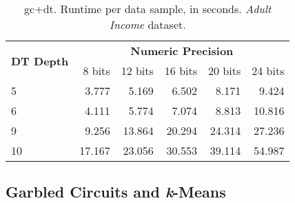 \begin{table}[!h]
\centering
\caption{\acs{gc}+\acs{dt}. Runtime per data sample, in seconds. \emph{Adult Income} dataset.}
\label{table:runtimeDTAI}
\vspace*{0.2cm}
\begin{tabular}{|l|r|r|r|r|r|}
\hline
\multirow{2}{*}{\textbf{DT Depth}} & \multicolumn{5}{c|}{\textbf{Numeric Precision}}         \\ \cline{2-6} 
                          & 8 bits & 12 bits & 16 bits & 20 bits & 24 bits \\ \hline
5                         & 3.777  & 5.169   & 6.502   & 8.171   & 9.424   \\ \hline
6                         & 4.111  & 5.774   & 7.074   & 8.813   & 10.816  \\ \hline
9                         & 9.256  & 13.864  & 20.294  & 24.314  & 27.236  \\ \hline
10                        & 17.167 & 23.056  & 30.553  & 39.114  & 54.987  \\ \hline
\end{tabular}
\end{table}

\clearpage
\subsection{Garbled Circuits and \textit{k}-Means}
\label{app:gckm_exec}


